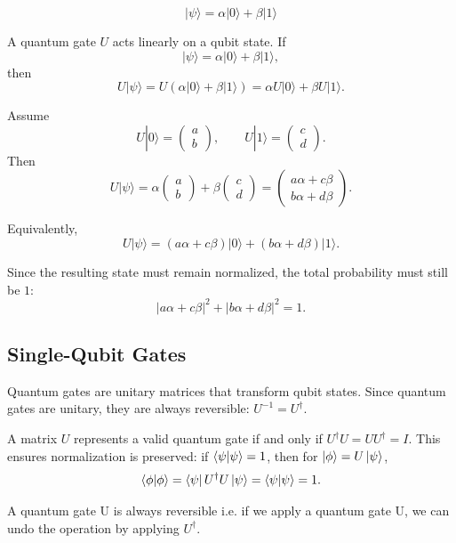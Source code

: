 \documentclass[10pt,a4paper]{article}
\begin{document}
\[
|\psi\rangle = \alpha |0\rangle + \beta |1\rangle
\]

A quantum gate \(U\) acts linearly on a qubit state. If
\[
|\psi\rangle = \alpha |0\rangle + \beta |1\rangle,
\]
then
\[
U|\psi\rangle
=
U(\alpha |0\rangle + \beta |1\rangle)
=
\alpha U|0\rangle + \beta U|1\rangle.
\]

Assume
\[
U|0\rangle =
\begin{pmatrix}
a \\ b
\end{pmatrix},
\qquad
U|1\rangle =
\begin{pmatrix}
c \\ d
\end{pmatrix}.
\]
Then
\[
U|\psi\rangle
=
\alpha
\begin{pmatrix}
a \\ b
\end{pmatrix}
+
\beta
\begin{pmatrix}
c \\ d
\end{pmatrix}
=
\begin{pmatrix}
a\alpha + c\beta \\
b\alpha + d\beta
\end{pmatrix}.
\]

Equivalently,
\[
U|\psi\rangle
=
(a\alpha + c\beta)|0\rangle
+
(b\alpha + d\beta)|1\rangle.
\]

Since the resulting state must remain normalized, the total probability must still be \(1\):
\[
|a\alpha + c\beta|^2 + |b\alpha + d\beta|^2 = 1.
\]
\subsection{Single-Qubit Gates}

Quantum gates are unitary matrices that transform qubit states. Since quantum gates are unitary, they are always reversible: $U^{-1}=U^\dagger$.

\begin{tcolorbox}[propstyle, title={Theorem: Quantum Gates Are Unitary}]
A matrix $U$ represents a valid quantum gate if and only if
$U^\dagger U=UU^\dagger=I$.
This ensures normalization is preserved: if
$\braket{\psi}{\psi}=1$, then for $\ket{\phi}=U\ket{\psi}$,
\[
\braket{\phi}{\phi}
=
\bra{\psi}U^\dagger U\ket{\psi}
=
\braket{\psi}{\psi}
=
1.
\]
\end{tcolorbox}

A quantum gate U is always reversible i.e. if we apply a quantum gate U, we can undo the operation by applying $U^\dagger$.
\end{document}
